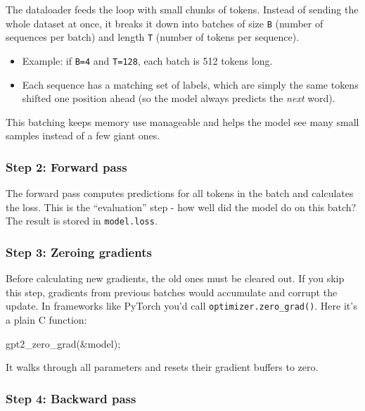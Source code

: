 \documentclass[
  letterpaper,
  DIV=11,
  numbers=noendperiod]{scrreprt}
\newenvironment{Shaded}{\begin{snugshade}}{\end{snugshade}}
\newcommand{\NormalTok}[1]{\textcolor[rgb]{0.00,0.23,0.31}{#1}}
\newcommand{\OperatorTok}[1]{\textcolor[rgb]{0.37,0.37,0.37}{#1}}
\providecommand{\tightlist}{%
  \setlength{\itemsep}{0pt}\setlength{\parskip}{0pt}}
\begin{document}
The dataloader feeds the loop with small chunks of tokens. Instead of
sending the whole dataset at once, it breaks it down into batches of
size \texttt{B} (number of sequences per batch) and length \texttt{T}
(number of tokens per sequence).

\begin{itemize}
\tightlist
\item
  Example: if \texttt{B=4} and \texttt{T=128}, each batch is 512 tokens
  long.
\item
  Each sequence has a matching set of labels, which are simply the same
  tokens shifted one position ahead (so the model always predicts the
  \emph{next} word).
\end{itemize}

This batching keeps memory use manageable and helps the model see many
small samples instead of a few giant ones.

\subsubsection{Step 2: Forward pass}\label{step-2-forward-pass}

The forward pass computes predictions for all tokens in the batch and
calculates the loss. This is the ``evaluation'' step - how well did the
model do on this batch? The result is stored in \texttt{model.loss}.

\subsubsection{Step 3: Zeroing
gradients}\label{step-3-zeroing-gradients}

Before calculating new gradients, the old ones must be cleared out. If
you skip this step, gradients from previous batches would accumulate and
corrupt the update. In frameworks like PyTorch you'd call
\texttt{optimizer.zero\_grad()}. Here it's a plain C function:

\begin{Shaded}
\begin{Highlighting}[]
\NormalTok{gpt2\_zero\_grad}\OperatorTok{(\&}\NormalTok{model}\OperatorTok{);}
\end{Highlighting}
\end{Shaded}

It walks through all parameters and resets their gradient buffers to
zero.

\subsubsection{Step 4: Backward pass}\label{step-4-backward-pass}
\end{document}
